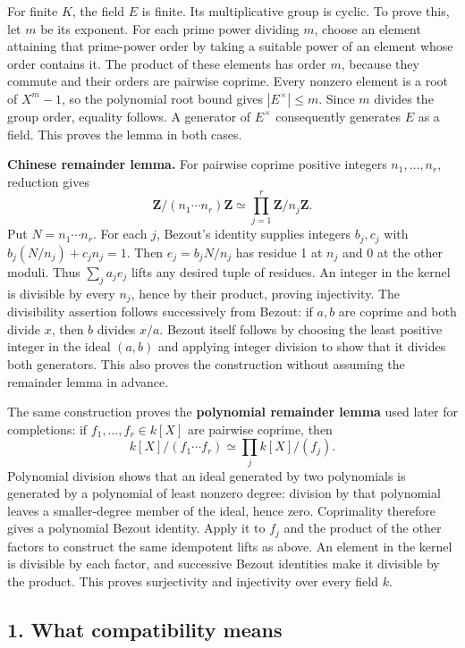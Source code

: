 \documentclass[11pt,a4paper]{article}
\begin{document}
For finite \(K\), the field \(E\) is finite. Its multiplicative group is
cyclic. To prove this, let \(m\) be its exponent. For each prime power
dividing \(m\), choose an element attaining that prime-power order by
taking a suitable power of an element whose order contains it. The
product of these elements has order \(m\), because they commute and
their orders are pairwise coprime. Every nonzero element is a root of
\(X^m-1\), so the polynomial root bound gives \(|E^\times|\leq m\).
Since \(m\) divides the group order, equality follows. A generator of
\(E^\times\) consequently generates \(E\) as a field. This proves the
lemma in both cases.

\textbf{Chinese remainder lemma.} For pairwise coprime positive integers
\(n_1,\ldots,n_r\), reduction gives \[
\mathbf Z/(n_1\cdots n_r)\mathbf Z
\simeq\prod_{j=1}^r\mathbf Z/n_j\mathbf Z.
\] Put \(N=n_1\cdots n_r\). For each \(j\), Bezout's identity supplies
integers \(b_j,c_j\) with \(b_j(N/n_j)+c_jn_j=1\). Then \(e_j=b_jN/n_j\)
has residue 1 at \(n_j\) and 0 at the other moduli. Thus
\(\sum_j a_je_j\) lifts any desired tuple of residues. An integer in the
kernel is divisible by every \(n_j\), hence by their product, proving
injectivity. The divisibility assertion follows successively from
Bezout: if \(a,b\) are coprime and both divide \(x\), then \(b\) divides
\(x/a\). Bezout itself follows by choosing the least positive integer in
the ideal \((a,b)\) and applying integer division to show that it
divides both generators. This also proves the construction without
assuming the remainder lemma in advance.

The same construction proves the \textbf{polynomial remainder lemma}
used later for completions: if \(f_1,\ldots,f_r\in k[X]\) are pairwise
coprime, then \[
k[X]/(f_1\cdots f_r)\simeq\prod_j k[X]/(f_j).
\] Polynomial division shows that an ideal generated by two polynomials
is generated by a polynomial of least nonzero degree: division by that
polynomial leaves a smaller-degree member of the ideal, hence zero.
Coprimality therefore gives a polynomial Bezout identity. Apply it to
\(f_j\) and the product of the other factors to construct the same
idempotent lifts as above. An element in the kernel is divisible by each
factor, and successive Bezout identities make it divisible by the
product. This proves surjectivity and injectivity over every field
\(k\).

\subsection{1. What compatibility means}\label{what-compatibility-means}
\end{document}
